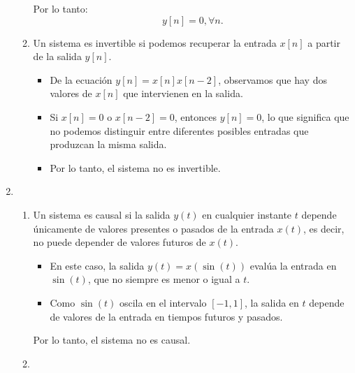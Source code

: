 \begin{enumerate}[label=\color{red}\textbf{\arabic*)}]
\begin{enumerate}[label=\color{red}\textbf{\alph*)}]
        Por lo tanto:  \[
            y[n]=0, \forall n.
        \] 
    \item {} 
        Un sistema es invertible si podemos recuperar la entrada $x[n]$ a partir de la salida  $y[n]$.
         \begin{itemize}[label=\textbullet]
             \item De la ecuación $y[n]=x[n]x[n-2]$, observamos que hay dos valores de  $x[n]$ que intervienen en la salida.
             \item Si  $x[n]=0$ o  $x[n-2]=0$, entonces  $y[n]=0$, lo que significa que no podemos distinguir entre diferentes posibles entradas que produzcan la misma salida.
             \item Por lo tanto, el sistema no es invertible.
        \end{itemize}
\end{enumerate}
\item {} 
\begin{enumerate}[label=\color{red}\textbf{\alph*)}]
    \item {}

        Un sistema es causal si la salida $y(t)$ en cualquier instante  $t$ depende únicamente de valores presentes o pasados de la entrada  $x(t)$, es decir, no puede depender de valores futuros de  $x(t)$.
         \begin{itemize}[label=\textbullet]
            \item  En este caso, la salida $y(t)=x(\sin(t))$ evalúa la entrada en $\sin(t)$, que no siempre es menor o igual a $t$.
            \item Como  $\sin(t)$ oscila en el intervalo $[-1,1]$, la salida en  $t$ depende de valores de la entrada en tiempos futuros y pasados.
        \end{itemize}
        Por lo tanto, el sistema no es causal.
    \item {} 


\end{enumerate}
\end{enumerate}
